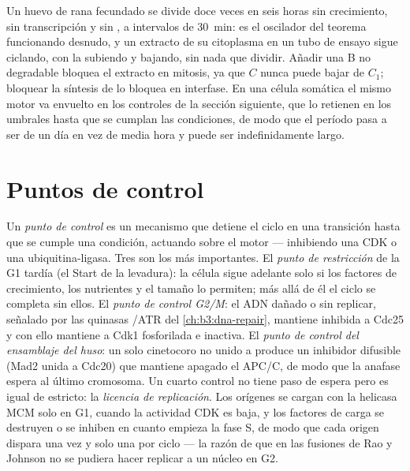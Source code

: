 \begin{example}\label{ex:b3:cell-cycle-apoptosis:frog}
Un huevo de rana fecundado se divide doce veces en seis horas sin
crecimiento, sin transcripción y sin , a intervalos de
\qty{30}{min}: es el oscilador del teorema funcionando desnudo, y un
extracto de su citoplasma en un tubo de ensayo sigue ciclando, con la
 subiendo y bajando, sin nada que dividir. Añadir una  B no
degradable bloquea el extracto en mitosis, ya que $C$ nunca puede bajar
de $C_{1}$; bloquear la síntesis de  lo bloquea en interfase. En
una célula somática el mismo motor va envuelto en los controles de la
sección siguiente, que lo retienen en los umbrales hasta que se cumplan
las condiciones, de modo que el período pasa a ser de un día en vez de
media hora y puede ser indefinidamente largo.
\end{example}

\section{Puntos de control}

\begin{definition}\label{def:b3:cell-cycle-apoptosis:checkpoints}
Un \emph{punto de control} es un mecanismo que detiene el ciclo en una
transición hasta que se cumple una condición, actuando sobre el motor ---
inhibiendo una CDK o una ubiquitina-ligasa. Tres son los más
importantes. El \emph{punto de restricción} de la G1 tardía (el Start de
la levadura): la célula sigue adelante solo si los factores de
crecimiento, los nutrientes y el tamaño lo permiten; más allá de él el
ciclo se completa sin ellos. El \emph{punto de control G2/M}: el ADN
dañado o sin replicar, señalado por las quinasas /ATR del
\cref{ch:b3:dna-repair}, mantiene inhibida a Cdc25 y con ello mantiene a
Cdk1 fosforilada e inactiva. El \emph{punto de control del ensamblaje del
huso}: un solo cinetocoro no unido a  produce un inhibidor
difusible (Mad2 unida a Cdc20) que mantiene apagado el APC/C, de modo que
la anafase espera al último cromosoma. Un cuarto control no tiene paso de
espera pero es igual de estricto: la \emph{licencia de replicación}. Los
orígenes se cargan con la helicasa MCM solo en G1, cuando la actividad
CDK es baja, y los factores de carga se destruyen o se inhiben en cuanto
empieza la fase S, de modo que cada origen dispara una vez y solo una por
ciclo --- la razón de que en las fusiones de Rao y Johnson no se pudiera
hacer replicar a un núcleo en G2.
\end{definition}

